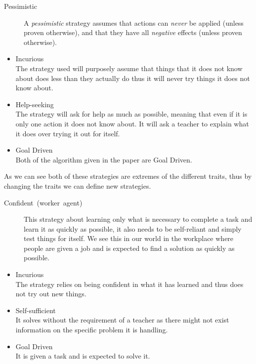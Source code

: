 \documentclass[master.tex]{subfiles}
\begin{document}
    \begin{description}
    \item [{Pessimistic}] A \emph{pessimistic} strategy assumes that actions
    can \emph{never} be applied (unless proven otherwise), and that they
    have all \emph{negative} effects (unless proven otherwise). \end{description}
    \begin{itemize}
    \item Incurious\\
    The strategy used will purposely assume that things that it does not
    know about does less than they actually do thus it will never try
    things it does not know about.
    \item Help-seeking\\
    The strategy will ask for help as much as possible, meaning that even
    if it is only one action it does not know about. It will ask a teacher
    to explain what it does over trying it out for itself.
    \item Goal Driven\\
    Both of the algorithm given in the paper are Goal Driven.
    \end{itemize}
    As we can see both of these strategies are extremes of the different
    traits, thus by changing the traits we can define new strategies.
    \begin{description}
    \item [{Confident~(worker~agent)}] This strategy about learning only
    what is necessary to complete a task and learn it as quickly as possible,
    it also needs to be self-reliant and simply test things for itself.
    We see this in our world in the workplace where people are given a
    job and is expected to find a solution as quickly as possible.\end{description}
    \begin{itemize}
    \item Incurious\\
    The strategy relies on being confident in what it has learned and
    thus does not try out new things.
    \item Self-sufficient\\
    It solves without the requirement of a teacher as there might not
    exist information on the specific problem it is handling.
    \item Goal Driven\\
    It is given a task and is expected to solve it.\end{itemize}
\end{document}
